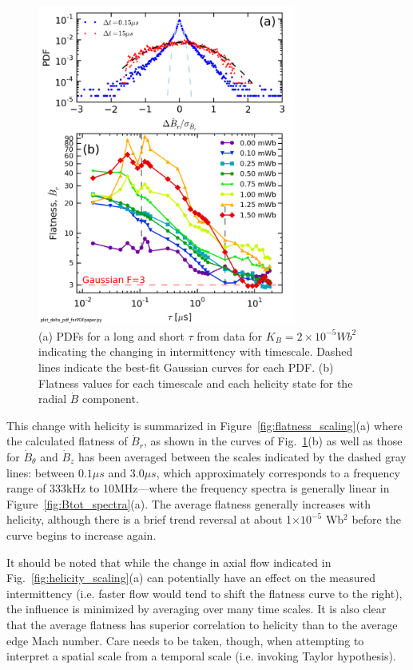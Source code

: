 \documentclass[aps,prl,amsmath,amssymb,reprint,superscriptaddress]{revtex4-1} %
\begin{document}
\begin{figure}[!htbp]
\centerline{
\includegraphics[width=8.5cm]{Br_flatness.png}}
\caption{\label{fig:Br_flatness} (a) PDFs for a long and short $\tau$ from data for $K_{B} = 2\times 10^{-5} Wb^{2}$ indicating the changing in intermittency with timescale. Dashed lines indicate the best-fit Gaussian curves for each PDF. (b) Flatness values for each timescale and each helicity state for the radial $\dot{B}$ component.}
\end{figure}

This change with helicity is summarized in Figure~\ref{fig:flatness_scaling}(a) where the calculated flatness of $\dot{B}_{r}$, as shown in the curves of Fig.~\ref{fig:Br_flatness}(b) as well as those for $\dot{B}_{\theta}$ and $\dot{B}_{z}$ has been averaged between the scales indicated by the dashed gray lines: between $0.1\mu s$ and $3.0\mu s$, which approximately corresponds to a frequency range of 333kHz to 10MHz---where the frequency spectra is generally linear in Figure~\ref{fig:Btot_spectra}(a). The average flatness generally increases with helicity, although there is a brief trend reversal at about 1$\times 10^{-5}$ Wb$^{2}$ before the curve begins to increase again.

It should be noted that while the change in axial flow indicated in Fig.~\ref{fig:helicity_scaling}(a) can potentially have an effect on the measured intermittency (i.e. faster flow would tend to shift the flatness curve to the right), the influence is minimized by averaging over many time scales. It is also clear that the average flatness has superior correlation to helicity than to the average edge Mach number. Care needs to be taken, though, when attempting to interpret a spatial scale from a temporal scale (i.e. invoking Taylor hypothesis).
\end{document}

